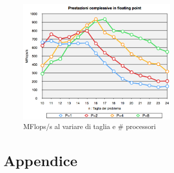 \documentclass[12pt,a4paper,oneside,openright]{article}
\begin{document}
\begin{figure}[htp] 

  \centering
      \includegraphics[width=0.70\textwidth]{immagini/mflips}
  \caption{\small MFlops/s al variare di taglia e \# processori}
	 \label{mflips}
\end{figure}


\newpage
\appendix
\section{Appendice}
\end{document}
